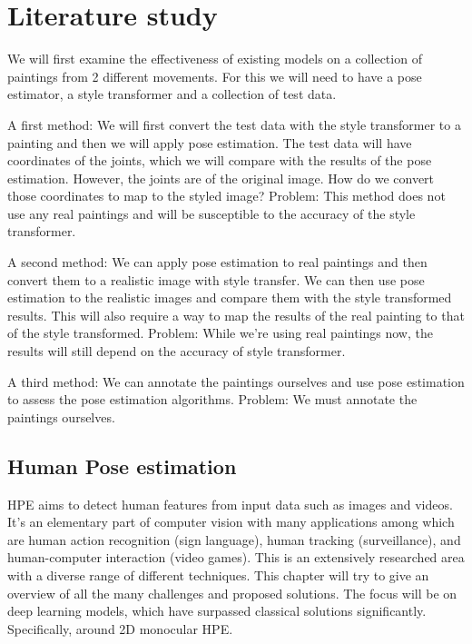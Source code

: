 \chapter{Literature study}
\label{chap:rel_work}

We will first examine the effectiveness of existing models on a collection of paintings from 2 different movements.
For this we will need to have a pose estimator, a style transformer and a collection of test data. 

A first method: We will first convert the test data with the style transformer to a painting and then we will apply pose estimation.
The test data will have coordinates of the joints, which we will compare with the results of the pose estimation.
However, the joints are of the original image. How do we convert those coordinates to map to the styled image? 
Problem: This method does not use any real paintings and will be susceptible to the accuracy of the style transformer.  

A second method: We can apply pose estimation to real paintings and then convert them to a realistic image with style transfer.
We can then use pose estimation to the realistic images and compare them with the style transformed results.
This will also require a way to map the results of the real painting to that of the style transformed. 
Problem: While we’re using real paintings now, the results will still depend on the accuracy of style transformer. 

A third method: We can annotate the paintings ourselves and use pose estimation to assess the pose estimation algorithms. 
Problem: We must annotate the paintings ourselves. 

\section{Human Pose estimation}
\label{sec:hpe}

\gls{HPE} aims to detect human features from input data such as images and videos.
It's an elementary part of computer vision with many applications among which are human action recognition (sign language), human tracking (surveillance), and human-computer interaction (video games).
This is an extensively researched area with a diverse range of different techniques.
This chapter will try to give an overview of all the many challenges and proposed solutions.
The focus will be on deep learning models, which have surpassed classical solutions significantly.
Specifically, around 2D monocular \gls{HPE}.\cite{Munea2020}\cite{Zheng2012}\cite{Liu2104}\cite{chen2022}

